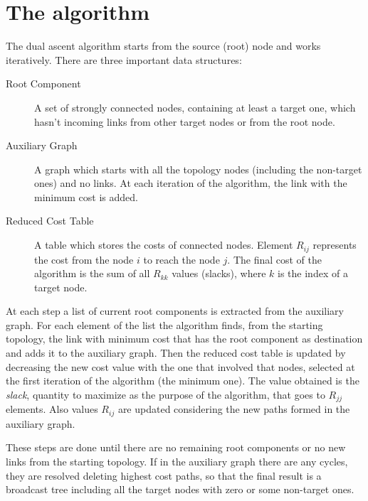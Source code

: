 \section{The algorithm}\label{sec:algorithm}

The dual ascent algorithm starts from the source (root) node and works
iteratively. There are three important data structures:

\begin{description}
	\item[Root Component] A set of strongly connected nodes, containing at
		least a target one, which hasn't incoming links from other
		target nodes or from the root node.
	\item[Auxiliary Graph] A graph which starts with all the topology nodes
		(including the non-target ones) and no links. At each iteration
		of the algorithm, the link with the minimum cost is added.
	\item[Reduced Cost Table] A table which stores the
		costs of connected nodes. Element \(R_{ij}\) represents the cost
		from the node \(i\) to reach the node \(j\). The final
		cost of the algorithm is the sum of all \(R_{kk}\) values
		(slacks), where \(k\) is the index of a target node.
\end{description}

At each step a list of current root components is extracted from the auxiliary
graph. For each element of the list the algorithm finds, from the starting
topology, the link with minimum cost that has the root component as destination
and adds it to the auxiliary graph. Then the reduced cost table is updated by
decreasing the new cost value with the one that involved that nodes, selected at
the first iteration of the algorithm (the minimum one). The value obtained is
the \emph{slack}, quantity to maximize as the purpose of the algorithm, that
goes to \(R_{jj}\) elements. Also values \(R_{ij}\) are updated considering the
new paths formed in the auxiliary graph.

These steps are done until there are no remaining root components or no new
links from the starting topology. If in the auxiliary graph there are any
cycles, they are resolved deleting highest cost paths, so that the final result
is a broadcast tree including all the target nodes with zero or some non-target
ones.
